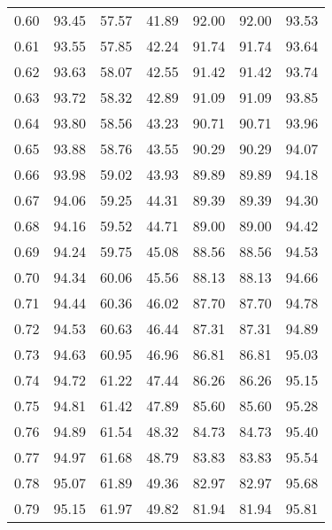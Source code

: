 \begin{tabular}{|c|c|c|c|c|c|c|}
      0.60 &     93.45 &     57.57 &      41.89 &   92.00 &      92.00 &         93.53 \\
      0.61 &     93.55 &     57.85 &      42.24 &   91.74 &      91.74 &         93.64 \\
      0.62 &     93.63 &     58.07 &      42.55 &   91.42 &      91.42 &         93.74 \\
      0.63 &     93.72 &     58.32 &      42.89 &   91.09 &      91.09 &         93.85 \\
      0.64 &     93.80 &     58.56 &      43.23 &   90.71 &      90.71 &         93.96 \\
      0.65 &     93.88 &     58.76 &      43.55 &   90.29 &      90.29 &         94.07 \\
      0.66 &     93.98 &     59.02 &      43.93 &   89.89 &      89.89 &         94.18 \\
      0.67 &     94.06 &     59.25 &      44.31 &   89.39 &      89.39 &         94.30 \\
      0.68 &     94.16 &     59.52 &      44.71 &   89.00 &      89.00 &         94.42 \\
      0.69 &     94.24 &     59.75 &      45.08 &   88.56 &      88.56 &         94.53 \\
      0.70 &     94.34 &     60.06 &      45.56 &   88.13 &      88.13 &         94.66 \\
      0.71 &     94.44 &     60.36 &      46.02 &   87.70 &      87.70 &         94.78 \\
      0.72 &     94.53 &     60.63 &      46.44 &   87.31 &      87.31 &         94.89 \\
      0.73 &     94.63 &     60.95 &      46.96 &   86.81 &      86.81 &         95.03 \\
      0.74 &     94.72 &     61.22 &      47.44 &   86.26 &      86.26 &         95.15 \\
      0.75 &     94.81 &     61.42 &      47.89 &   85.60 &      85.60 &         95.28 \\
      0.76 &     94.89 &     61.54 &      48.32 &   84.73 &      84.73 &         95.40 \\
      0.77 &     94.97 &     61.68 &      48.79 &   83.83 &      83.83 &         95.54 \\
      0.78 &     95.07 &     61.89 &      49.36 &   82.97 &      82.97 &         95.68 \\
      0.79 &     95.15 &     61.97 &      49.82 &   81.94 &      81.94 &         95.81 \\

\end{tabular}
